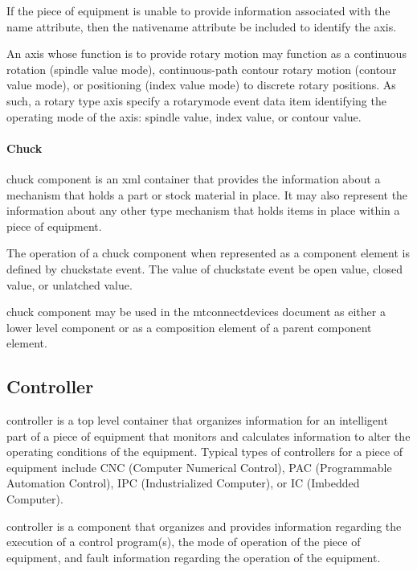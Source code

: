 If the piece of equipment is unable to provide information associated with the \gls{name} attribute, then the \gls{nativename} attribute \must be included to identify the axis.

An axis whose function is to provide rotary motion may function as a continuous rotation (\gls{spindle value} mode), continuous-path contour rotary motion (\gls{contour value} mode), or positioning (\gls{index value} mode) to discrete rotary positions.   As such, a \gls{rotary} type axis \should specify a \gls{rotarymode event} data item identifying the operating mode of the axis: \gls{spindle value}, \gls{index value}, or \gls{contour value}.

\paragraph{Chuck}\mbox{}

\gls{chuck component} is an \gls{xml} container that provides the information about a mechanism that holds a part or stock material in place.   It may also represent the information about any other type mechanism that holds items in place within a piece of equipment.

The operation of a \gls{chuck component} when represented as a \gls{component} element is defined by \gls{chuckstate event}. The value of \gls{chuckstate event} \must be \gls{open value}, \gls{closed value}, or \gls{unlatched value}.

\gls{chuck component} may be used in the \gls{mtconnectdevices} document as either a \gls{lower level} component or as a \gls{composition} element of a parent \gls{component} element.

\subsection{Controller}

\gls{controller} is a \gls{top level} container that organizes information for an intelligent part of a piece of equipment that monitors and calculates information to alter the operating conditions of the equipment.  Typical types of controllers for a piece of equipment include CNC (Computer Numerical Control), PAC (Programmable Automation Control), IPC (Industrialized Computer), or IC (Imbedded Computer).

\gls{controller} is a component that organizes and provides information regarding the execution of a control program(s), the mode of operation of the piece of equipment, and fault information regarding the operation of the equipment.

